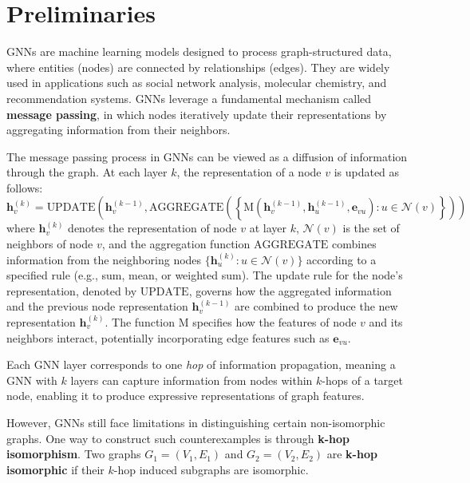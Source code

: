 \section{Preliminaries}
GNNs are machine learning models designed to process graph-structured data, where entities (nodes) are connected by relationships (edges). They are widely used in applications such as social network analysis, molecular chemistry, and recommendation systems. GNNs leverage a fundamental mechanism called \textbf{message passing}, in which nodes iteratively update their representations by aggregating information from their neighbors.

The message passing process in GNNs can be viewed as a diffusion of information through the graph. At each layer $k$, the representation of a node $v$ is updated as follows:
\begin{equation*}
\mathbf{h}_v^{(k)} = \text{UPDATE}\left( \mathbf{h}_v^{(k-1)}, \text{AGGREGATE}\left( \left\{ \text{M}\left( \mathbf{h}_v^{(k-1)}, \mathbf{h}_u^{(k-1)}, \mathbf{e}_{vu} \right) : u \in \mathcal{N}(v) \right\} \right) \right)
\end{equation*}
where $ \mathbf{h}_v^{(k)} $ denotes the representation of node $ v $ at layer $ k $, $ \mathcal{N}(v) $ is the set of neighbors of node $ v $, and the aggregation function $ \text{AGGREGATE} $ combines information from the neighboring nodes $ \{ \mathbf{h}_u^{(k)} : u \in \mathcal{N}(v) \} $ according to a specified rule (e.g., sum, mean, or weighted sum).  The update rule for the node's representation, denoted by $ \text{UPDATE} $, governs how the aggregated information and the previous node representation $ \mathbf{h}_v^{(k-1)} $ are combined to produce the new representation $ \mathbf{h}_v^{(k)} $. The function $ \text{M} $ specifies how the features of node $ v $ and its neighbors interact, potentially incorporating edge features such as $ \mathbf{e}_{vu} $.

Each GNN layer corresponds to one \textit{hop} of information propagation, meaning a GNN with $k$ layers can capture information from nodes within $k$-hops of a target node, enabling it to produce expressive representations of graph features.


However, GNNs still face limitations in distinguishing certain non-isomorphic graphs. One way to construct such counterexamples is through \textbf{k-hop isomorphism}. Two graphs $ G_1 = (V_1, E_1) $ and $ G_2 = (V_2, E_2) $ are \textbf{k-hop isomorphic} if their $ k $-hop induced subgraphs are isomorphic.


